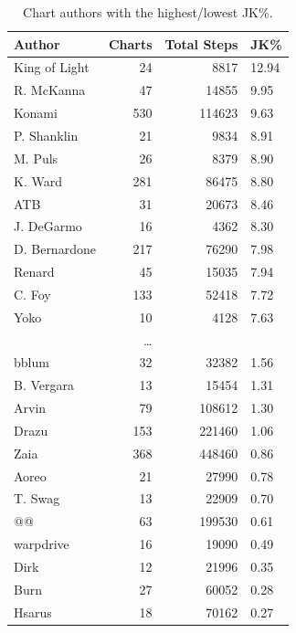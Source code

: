 \documentclass[10pt]{sigplanconf}
\begin{document}
\begin{table}[p]
	\begin{center}
		\small
	\begin{tabular}{l|r|r|l}
		\bf Author & \bf Charts & \bf Total Steps & \bf JK\% \\
		\hline
		King of Light &  24 &   8817 & 12.94 \\
		R. McKanna    &  47 &  14855 & 9.95 \\
		Konami        & 530 & 114623 & 9.63 \\
		P. Shanklin   &  21 &   9834 & 8.91 \\
		M. Puls       &  26 &   8379 & 8.90 \\
		K. Ward       & 281 &  86475 & 8.80 \\
		ATB           &  31 &  20673 & 8.46 \\
		J. DeGarmo    &  16 &   4362 & 8.30 \\
		D. Bernardone & 217 &  76290 & 7.98 \\
		Renard        &  45 &  15035 & 7.94 \\
		C. Foy        & 133 &  52418 & 7.72 \\
		Yoko          &  10 &   4128 & 7.63 \\
		\multicolumn{4}{c}{\normalsize\dots} \\
		bblum         &  32 &  32382 & 1.56 \\
		B. Vergara    &  13 &  15454 & 1.31 \\
		Arvin         &  79 & 108612 & 1.30 \\
		Drazu         & 153 & 221460 & 1.06 \\
		Zaia          & 368 & 448460 & 0.86 \\
		Aoreo         &  21 &  27990 & 0.78 \\
		T. Swag       &  13 &  22909 & 0.70 \\
		@@            &  63 & 199530 & 0.61 \\
		warpdrive     &  16 &  19090 & 0.49 \\
		Dirk          &  12 &  21996 & 0.35 \\
		Burn          &  27 &  60052 & 0.28 \\
		Hsarus        &  18 &  70162 & 0.27 \\
	\end{tabular}
	\end{center}
	\caption{Chart authors with the highest/lowest JK\%.}
	\label{tab:author-jk}
\end{table}
\end{document}
